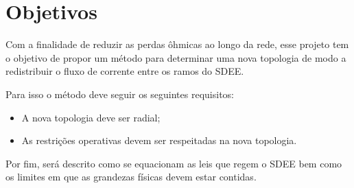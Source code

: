 \section{Objetivos}

Com a finalidade de reduzir as perdas ôhmicas ao longo da rede, esse projeto tem o objetivo de propor um método para determinar uma nova topologia de modo a redistribuir o fluxo de corrente entre os ramos do SDEE.

Para isso o método deve seguir os seguintes requisitos:

\begin{itemize}
    \item A nova topologia deve ser radial;
    
    \item As restrições operativas devem ser respeitadas na nova topologia.
\end{itemize}

Por fim, será descrito como se equacionam as leis que regem o SDEE bem como os limites em que as grandezas físicas devem estar contidas.
